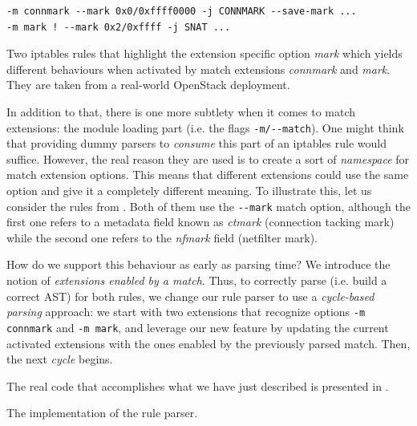 \begin{listing}
  \lstset{basicstyle=\ttfamily}
  \lstset{numbers=none, frame=single, basicstyle=\ttfamily,
    xleftmargin=0.05\textwidth, xrightmargin=0.05\textwidth
  }
  \small
  \begin{lstlisting}
-m connmark --mark 0x0/0xffff0000 -j CONNMARK --save-mark ...
-m mark ! --mark 0x2/0xffff -j SNAT ...
  \end{lstlisting}
  \caption{Two iptables rules that highlight the extension specific option
  \emph{mark} which yields different behaviours when activated by match
  extensions \emph{connmark} and \emph{mark}.  They are taken from a real-world
  OpenStack deployment.}
  \label{lst:namespace-example}
\end{listing}

In addition to that, there is one more subtlety when it comes to match
extensions: the module loading part (i.e. the flags \lstinline{-m/--match}).
One might think that providing dummy parsers to \emph{consume} this part of an
iptables rule would suffice.  However, the real reason they are used is to
create a sort of \emph{namespace} for match extension options.  This means that
different extensions could use the same option and give it a completely
different meaning.  To illustrate this, let us consider the rules from
.  Both of them use the
\lstinline{--mark} match option, although the first one refers to a metadata
field known as \emph{ctmark} (connection tacking mark) while the second one
refers to the \emph{nfmark} field (netfilter mark).

How do we support this behaviour as early as parsing time?  We introduce the
notion of \emph{extensions enabled by a match}.  Thus, to correctly parse (i.e.
build a correct AST) for both rules, we change our rule parser to use a
\emph{cycle-based parsing} approach: we start with two extensions that
recognize options \lstinline{-m connmark} and \lstinline{-m mark}, and leverage
our new feature by updating the current activated extensions with the ones
enabled by the previously parsed match.  Then, the next \emph{cycle} begins.

The real code that accomplishes what we have just described is presented in
.

\begin{listing}[H]
  \caption{The implementation of the rule parser.}
  \label{lst:rule-parser}
\end{listing}


